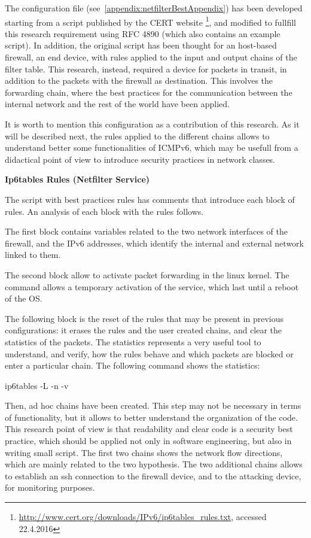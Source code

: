 \documentclass[12pt]{article}
\begin{document}
The configuration file (see~\ref{appendix:netfilterBestAppendix}) has been developed starting from a script published by the CERT website \footnote{\url{http://www.cert.org/downloads/IPv6/ip6tables_rules.txt}, accessed 22.4.2016}, and modified to fullfill this research requirement using RFC 4890 (which also contains an example script)\cite{rfc4890}. In addition, the original script has been thought for an host-based firewall, an end device, with rules applied to the input and output chains of the filter table. This research, instead, required a device for packets in transit, in addition to the packets with the firewall as destination. This involves the forwarding chain, where the best practices for the communication between the internal network and the rest of the world have been applied.

It is worth to mention this configuration as a contribution of this research. As it will be described next, the rules applied to the different chains allows to understand better some functionalities of ICMPv6, which may be usefull from a didactical point of view to introduce security practices in network classes.

\textbf{Ip6tables Rules (Netfilter Service)}

The script with best practices rules has comments that introduce each block of rules. An analysis of each block with the rules follows.

The first block contains variables related to the two network interfaces of the firewall, and the IPv6 addresses, which identify the internal and external network linked to them.

The second block allow to activate packet forwarding in the linux kernel. The command allows a temporary activation of the service, which last until a reboot of the OS.

The following block is the reset of the rules that may be present in previous configurations: it erases the rules and the user created chains, and clear the statistics of the packets. The statistics represents a very useful tool to understand, and verify, how the rules behave and which packets are blocked or enter a particular chain. The following command shows the statistics:

ip6tables -L -n -v

Then, ad hoc chains have been created. This step may not be necessary in terms of functionality, but it allows to better understand the organization of the code. This research point of view is that readability and clear code is a security best practice, which should be applied not only in software engineering, but also in writing small script. The first two chains shows the network flow directions, which are mainly related to the two hypothesis. The two additional chains allows to establish an ssh connection to the firewall device, and to the attacking device, for monitoring purposes.
\end{document}
